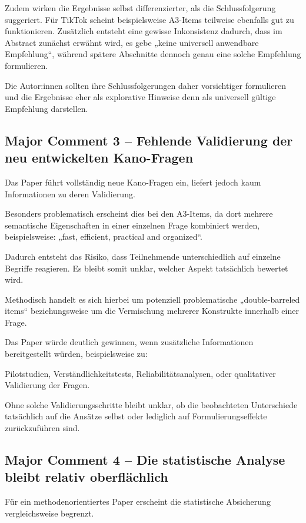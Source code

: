 \documentclass[12pt,DIV=14, version=first, BCOR=10mm,a4paper,twoside,parskip=half-,headsepline,headinclude]{scrartcl}
\begin{document}
Zudem wirken die Ergebnisse selbst differenzierter, als die Schlussfolgerung suggeriert. Für TikTok scheint beispielsweise A3-Items teilweise ebenfalls gut zu funktionieren. Zusätzlich entsteht eine gewisse Inkonsistenz dadurch, dass im Abstract zunächst erwähnt wird, es gebe „keine universell anwendbare Empfehlung“, während spätere Abschnitte dennoch genau eine solche Empfehlung formulieren.

Die Autor:innen sollten ihre Schlussfolgerungen daher vorsichtiger formulieren und die Ergebnisse eher als explorative Hinweise denn als universell gültige Empfehlung darstellen.

\subsection{Major Comment 3 – Fehlende Validierung der neu entwickelten Kano-Fragen}

Das Paper führt vollständig neue Kano-Fragen ein, liefert jedoch kaum Informationen zu deren Validierung.

Besonders problematisch erscheint dies bei den A3-Items, da dort mehrere semantische Eigenschaften in einer einzelnen Frage kombiniert werden, beispielsweise:
„fast, efficient, practical and organized“.

Dadurch entsteht das Risiko, dass Teilnehmende unterschiedlich auf einzelne Begriffe reagieren. Es bleibt somit unklar, welcher Aspekt tatsächlich bewertet wird.

Methodisch handelt es sich hierbei um potenziell problematische „double-barreled items“ beziehungsweise um die Vermischung mehrerer Konstrukte innerhalb einer Frage.

Das Paper würde deutlich gewinnen, wenn zusätzliche Informationen bereitgestellt würden, beispielsweise zu:

Pilotstudien,
Verständlichkeitstests,
Reliabilitätsanalysen,
oder qualitativer Validierung der Fragen.

Ohne solche Validierungsschritte bleibt unklar, ob die beobachteten Unterschiede tatsächlich auf die Ansätze selbst oder lediglich auf Formulierungseffekte zurückzuführen sind.

\subsection{Major Comment 4 – Die statistische Analyse bleibt relativ oberflächlich}

Für ein methodenorientiertes Paper erscheint die statistische Absicherung vergleichsweise begrenzt.
\end{document}
